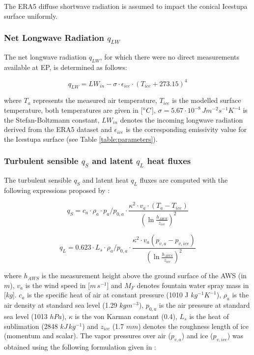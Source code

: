 \documentclass[utf8]{frontiersSCNS} %
\begin{document}
The ERA5 diffuse shortwave radiation is assumed to impact the conical Icestupa surface uniformly. 

\subsubsection{Net Longwave Radiation \texorpdfstring{$q_{LW}$}{Lg}}

The net longwave radiation $q_{LW}$, for which there were no direct measurements available at EP, is
determined as follows:

\begin{equation} q_{LW}= LW_{in}-\sigma \cdot \epsilon_{ice} \cdot {(T_{ice}+ 273.15)}^4
\label{eqn:LW} \end{equation}

where $T_a$ represents the measured air temperature, $T_{ice}$ is the modelled surface temperature, both temperatures
are given in [$\degree C$], $\sigma=5.67\cdot 10^{-8}\,Jm^{-2}s^{-1}K^{-4}$ is the Stefan-Boltzmann constant, $LW_{in}$
denotes the incoming longwave radiation derived from the ERA5 dataset and $\epsilon_{ice}$ is the corresponding
emissivity value for the Icestupa surface (see Table \ref{table:parameters}).

\subsubsection{Turbulent sensible \texorpdfstring{$q_{S}$}{Lg} and latent \texorpdfstring{$q_{L}$}{Lg} heat fluxes }

The turbulent sensible $q_{S}$ and latent heat $q_{L}$ fluxes are computed with the following expressions proposed by
\cite{Garratt_1992}:

\begin{equation} q_{S}=c_{a} \cdot \rho_{a} \cdot p_{a}/p_{0,a} \cdot \frac{\kappa^2 \cdot v_a \cdot
(T_a-T_{ice})}{{(\ln{\frac{h_{AWS}}{z_{ice}}})}^2} \label{eqn:qs} \end{equation}

\begin{equation} q_{L}=0.623 \cdot L_s \cdot \rho_{a}/p_{0,a} \cdot \frac{\kappa^2 \cdot
v_a(p_{v,a}-p_{v,ice})}{{(\ln{\frac{h_{AWS}}{z_{ice}}})}^2} \end{equation}

where $h_{AWS}$ is the measurement height above the ground surface of the AWS (in $m$), $v_a$ is the wind speed in
[$m\,s^{-1}$] and $M_{F}$ denotes fountain water spray mass in [$kg$]. $c_a$ is the specific heat of air at constant
pressure (1010 J $kg^{-1} K^{-1}$), $\rho_{a}$ is the air density at standard sea level (1.29 $kg m^{-3}$), $p_{0,a}$ is
the air pressure at standard sea level (1013 $hPa$), $\kappa$ is the von Karman constant (0.4), $L_s$ is the heat of
sublimation (2848 $kJ\, kg^{-1}$) and $z_{ice}$ (1.7 $mm$) denotes the roughness length of ice (momentum and scalar).
The vapor pressures over air ($p_{v,a}$) and ice ($p_{v,ice}$) was obtained using the following formulation given in
\cite{WMO_2018}:
\end{document}

